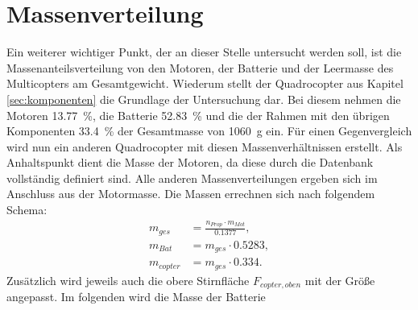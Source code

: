 \section{Massenverteilung}
\label{sec:massenverteilung}
Ein weiterer wichtiger Punkt, der an dieser Stelle untersucht werden soll, ist die Massenanteilsverteilung von den Motoren, der Batterie und der Leermasse des Multicopters am Gesamtgewicht. Wiederum stellt der Quadrocopter aus Kapitel \ref{sec:komponenten} die Grundlage der Untersuchung dar. Bei diesem nehmen die Motoren \SI{13,77}{\%}, die Batterie \SI{52,83}{\%} und die der Rahmen mit den übrigen Komponenten \SI{33,4}{\%} der Gesamtmasse von \SI{1060}{g} ein. Für einen Gegenvergleich wird nun ein anderen Quadrocopter mit diesen Massenverhältnissen erstellt. Als Anhaltspunkt dient die Masse der Motoren, da diese durch die Datenbank vollständig definiert sind. Alle anderen Massenverteilungen ergeben sich im Anschluss aus der Motormasse.
Die Massen errechnen sich nach folgendem Schema:
\begin{align}
	m_{ges} &= \frac{n_{Prop}\cdot m_{Mot}}{0.1377} , \\
	m_{Bat} &= m_{ges}\cdot 0.5283 , \\
	m_{copter} &= m_{ges}\cdot 0.334.
\end{align}
Zusätzlich wird jeweils auch die obere Stirnfläche \ensuremath{F_{copter,oben}} mit der Größe angepasst. Im folgenden wird die Masse der Batterie 


